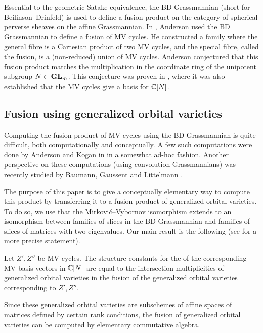 \documentclass{article}
\begin{document}
Essential to the geometric Satake equivalence, the BD Grassmannian (short for Beilinson--Drinfeld) is used to define a fusion product on the category of spherical perverse sheaves on the affine Grassmannian.  In \cite{anderson2003polytope}, Anderson used the BD Grassmannian to define a fusion of MV cycles.  He constructed a family where the general fibre is a Cartesian product of two MV cycles, and the special fibre, called the fusion, is a (non-reduced) union of MV cycles.  Anderson conjectured that this fusion product matches the multiplication in the coordinate ring of the unipotent subgroup $ N \subset{\mathbf{GL}}_m$.  This conjecture was proven in \cite{baumann2019mirkovic}, where it was also established that the MV cycles give a basis for $ \mathbb C[N]$.


\subsection{Fusion using generalized orbital varieties}
\label{ss:fugov}
% 
Computing the fusion product of MV cycles using the BD Grassmannian is quite difficult, both computationally and conceptually.  A few such computations were done by Anderson and Kogan in \cite{anderson2006algebra} in a somewhat ad-hoc fashion.  Another perspective on these computations (using convolution Grassmannians) was recently studied by Baumann, Gaussent and Littelmann \cite{baumann2020bases}.

The purpose of this paper is to give a conceptually elementary way to compute this product by transferring it to a fusion product of generalized orbital varieties.  To do so, we use that the Mirkovi\'c--Vybornov isomorphism extends to an isomorphism between families of slices in the BD Grassmannian and families of slices of matrices with two eigenvalues. Our main result is the following (see  for a more precise statement).

\begin{theorem}
    Let $ Z', Z'' $ be MV cycles.  The structure constants for the of the corresponding MV basis vectors in $\mathbb C[N]$ are equal to the intersection multiplicities of generalized orbital varieties in the fusion of the generalized orbital varieties corresponding to $ Z', Z''$.
\end{theorem}

Since these generalized orbital varieties are subschemes of affine spaces of matrices defined by certain rank conditions, the fusion of generalized orbital varieties can be computed by elementary commutative algebra.
\end{document}
